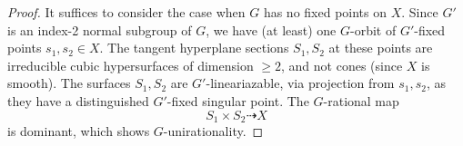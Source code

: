 \documentclass[10pt,a4paper]{amsart}
\begin{document}
\begin{proof} 
It suffices to consider the case when $G$ has no fixed points on $X$. Since $G'$ is an index-2 normal subgroup of $G$, we have (at least) one $G$-orbit of $G'$-fixed points $s_1,s_2 \in X$.
The tangent hyperplane sections $S_1,S_2$ at these points 
are irreducible cubic hypersurfaces of dimension $\ge 2$, and not cones (since $X$ is smooth). The surfaces $S_1,S_2$ are $G'$-lineariazable, 
via projection from $s_1, s_2$, as they have a distinguished $G'$-fixed singular point.  The $G$-rational map 
$$
S_1\times S_2\dashrightarrow X
$$
is dominant, which shows $G$-unirationality. 
\end{proof}
\end{document}
